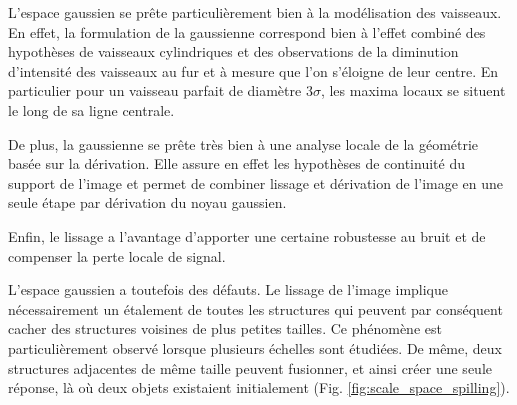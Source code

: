   L'espace gaussien se prête particulièrement bien à la modélisation des vaisseaux. En effet, la formulation de la gaussienne correspond bien à l'effet combiné des hypothèses de vaisseaux cylindriques et des observations de la diminution d'intensité des vaisseaux au fur et à mesure que l'on s'éloigne de leur centre. En particulier pour un vaisseau parfait de diamètre $3\sigma$, les maxima locaux se situent le long de sa ligne centrale.
  
  De plus, la gaussienne se prête très bien à une analyse locale de la géométrie basée sur la dérivation. Elle assure en effet les hypothèses de continuité du support de l'image et permet de combiner lissage et dérivation de l'image en une seule étape par dérivation du noyau gaussien.
  
  Enfin, le lissage a l'avantage d'apporter une certaine robustesse au bruit et de compenser la perte locale de signal.
  
  L'espace gaussien a toutefois des défauts. Le lissage de l'image implique nécessairement un étalement de toutes les structures qui peuvent par conséquent cacher des structures voisines de plus petites tailles. Ce phénomène est particulièrement observé lorsque plusieurs échelles sont étudiées. De même, deux structures adjacentes de même taille peuvent fusionner, et ainsi créer une seule réponse, là où deux objets existaient initialement (Fig. \ref{fig:scale_space_spilling}).
  
